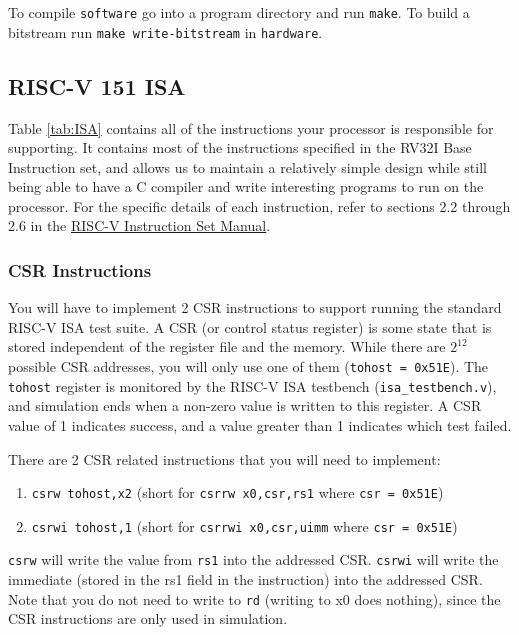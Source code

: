 \documentclass[11pt]{article}
\begin{document}
To compile \texttt{software} go into a program directory and run \texttt{make}.
To build a bitstream run \texttt{make write-bitstream} in \texttt{hardware}.

\subsection{RISC-V 151 ISA}
Table \ref{tab:ISA} contains all of the instructions your processor is responsible for supporting.
It contains most of the instructions specified in the RV32I Base Instruction set, and allows us to maintain a relatively simple design while still being able to have a C compiler and write interesting programs to run on the processor.
For the specific details of each instruction, refer to sections 2.2 through 2.6 in the \href{http://riscv.org/specifications/}{RISC-V Instruction Set Manual}.

\subsubsection{CSR Instructions}
You will have to implement 2 CSR instructions to support running the standard RISC-V ISA test suite.
A CSR (or control status register) is some state that is stored independent of the register file and the memory.
While there are $2^{12}$ possible CSR addresses, you will only use one of them (\texttt{tohost = 0x51E}).
The \texttt{tohost} register is monitored by the RISC-V ISA testbench (\verb|isa_testbench.v|), and simulation ends when a non-zero value is written to this register.
A CSR value of 1 indicates success, and a value greater than 1 indicates which test failed.

There are 2 CSR related instructions that you will need to implement:
\begin{enumerate}
  \item \texttt{csrw tohost,x2}  (short for \texttt{csrrw x0,csr,rs1} where \texttt{csr = 0x51E})
  \item \texttt{csrwi tohost,1}  (short for \texttt{csrrwi x0,csr,uimm} where \texttt{csr = 0x51E})
\end{enumerate}

\texttt{csrw} will write the value from \texttt{rs1} into the addressed CSR.
\texttt{csrwi} will write the immediate (stored in the rs1 field in the instruction) into the addressed CSR.
Note that you do not need to write to \texttt{rd} (writing to x0 does nothing), since the CSR instructions are only used in simulation.


\end{document}
